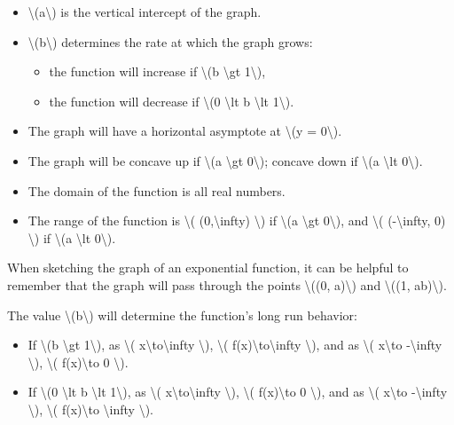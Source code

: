 \begin{itemize}
\tightlist
\item
  \textbackslash{}(a\textbackslash{}) is the vertical intercept of the
  graph.
\item
  \textbackslash{}(b\textbackslash{}) determines the rate at which the
  graph grows:

  \begin{itemize}
  \tightlist
  \item
    the function will increase if \textbackslash{}(b \textbackslash{}gt
    1\textbackslash{}),
  \item
    the function will decrease if \textbackslash{}(0 \textbackslash{}lt
    b \textbackslash{}lt 1\textbackslash{}).
  \end{itemize}
\item
  The graph will have a horizontal asymptote at \textbackslash{}(y =
  0\textbackslash{}).
\item
  The graph will be concave up if \textbackslash{}(a \textbackslash{}gt
  0\textbackslash{}); concave down if \textbackslash{}(a
  \textbackslash{}lt 0\textbackslash{}).
\item
  The domain of the function is all real numbers.
\item
  The range of the function is \textbackslash{}(
  (0,\textbackslash{}infty) \textbackslash{}) if \textbackslash{}(a
  \textbackslash{}gt 0\textbackslash{}), and \textbackslash{}(
  (-\textbackslash{}infty, 0) \textbackslash{}) if \textbackslash{}(a
  \textbackslash{}lt 0\textbackslash{}).
\end{itemize}

When sketching the graph of an exponential function, it can be helpful
to remember that the graph will pass through the points
\textbackslash{}((0, a)\textbackslash{}) and \textbackslash{}((1,
ab)\textbackslash{}).

The value \textbackslash{}(b\textbackslash{}) will determine the
function's long run behavior:

\begin{itemize}
\tightlist
\item
  If \textbackslash{}(b \textbackslash{}gt 1\textbackslash{}), as
  \textbackslash{}( x\textbackslash{}to\textbackslash{}infty
  \textbackslash{}), \textbackslash{}(
  f(x)\textbackslash{}to\textbackslash{}infty \textbackslash{}), and as
  \textbackslash{}( x\textbackslash{}to -\textbackslash{}infty
  \textbackslash{}), \textbackslash{}( f(x)\textbackslash{}to 0
  \textbackslash{}).
\item
  If \textbackslash{}(0 \textbackslash{}lt b \textbackslash{}lt
  1\textbackslash{}), as \textbackslash{}(
  x\textbackslash{}to\textbackslash{}infty \textbackslash{}),
  \textbackslash{}( f(x)\textbackslash{}to 0 \textbackslash{}), and as
  \textbackslash{}( x\textbackslash{}to -\textbackslash{}infty
  \textbackslash{}), \textbackslash{}( f(x)\textbackslash{}to
  \textbackslash{}infty \textbackslash{}).
\end{itemize}

